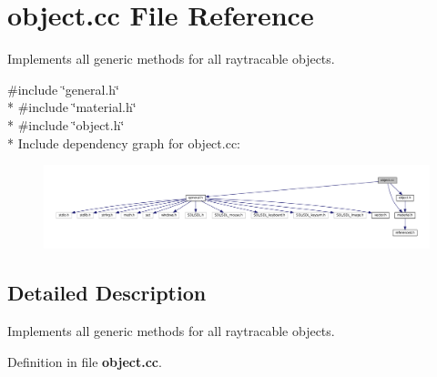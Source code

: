 \section{object.\+cc File Reference}
\label{object_8cc}


Implements all generic methods for all raytracable objects.  


{\ttfamily \#include \char`\"{}general.\+h\char`\"{}}\\*
{\ttfamily \#include \char`\"{}material.\+h\char`\"{}}\\*
{\ttfamily \#include \char`\"{}object.\+h\char`\"{}}\\*
Include dependency graph for object.\+cc\+:
\nopagebreak
\begin{figure}[H]
\begin{center}
\leavevmode
\includegraphics[width=350pt]{object_8cc__incl}
\end{center}
\end{figure}


\subsection{Detailed Description}
Implements all generic methods for all raytracable objects. 



Definition in file {\bf object.\+cc}.

